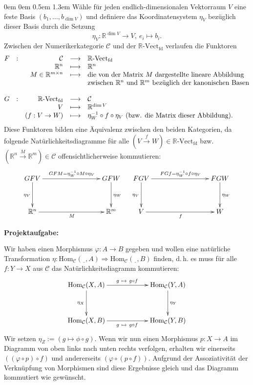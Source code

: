 \documentclass[a4paper,ngerman]{scrartcl}
\theoremstyle{definition}
\theoremstyle{plain}
\theoremstyle{remark}
\newcommand{\R}{\mathbb{R}}
\newcommand{\C}{\mathcal{C}}
\newcommand{\Hom}{\mathrm{Hom}}
\newcommand{\Vect}[1]{#1\text{-}\mathrm{Vect}}
\newcommand{\freist}{\underline{\ \ }}
\begin{document}
\begin{list}{}{0em \leftmargin0em \itemindent0.5em \itemsep 1.3em}
Wähle für jeden endlich-dimensionalen Vektorraum $V$ eine feste Basis $(b_1, \ldots, b_{\dim V})$ und definiere das Koordinatensystem $\eta_V$ bezüglich dieser Basis durch die Setzung
\[ \eta_V:\R^{\dim V} \to V,\ e_i \mapsto b_i. \]
Zwischen der Numerikerkategorie $\C$ und der $\Vect{\R}_{\mathrm{fd}}$ verlaufen die Funktoren
\[ \begin{array}{@{}rcrcl@{}}
  F &:& \C & \longrightarrow & \Vect{\R}_{\mathrm{fd}}\\
  && \R^{n} & \longmapsto & \R^{n}\\
  && M \in \R^{m \times n} & \longmapsto & \text{die von der Matrix $M$ dargestellte lineare Abbildung}\\
  &&&& \text{zwischen $\R^n$ und $\R^m$ bezüglich der kanonischen Basen}\\\\
  G &:& \Vect{\R}_{\mathrm{fd}} & \longrightarrow & \C\\
  && V & \longmapsto & \R^{\dim V}\\
  && (f:V \to W) & \longmapsto & \eta_W^{-1} \circ f \circ \eta_V \text{ (bzw. die Matrix dieser Abbildung).}
\end{array} \]
Diese Funktoren bilden eine Äquivalenz zwischen den beiden Kategorien, da folgende Natürlichkeitsdiagramme für alle $(V \xrightarrow{f} W) \in \Vect{\R}_{\mathrm{fd}}$ bzw. $(\R^n \xrightarrow{M} \R^m) \in \C$ offensichtlicherweise kommutieren:
\[ \xymatrixcolsep{7pc}\xymatrixrowsep{3pc}
\xymatrix{
  GFV \ar[d]_{\eta_V} \ar[r]^{GFM = \eta_W^{-1} \circ M \circ \eta_V} & GFW \ar[d]^{\eta_W}\\
  \R^{n} \ar[r]_{M} & \R^{m}
}
\quad
\xymatrix{
  FGV \ar[d]_{\eta_V} \ar[r]^{FGf = \eta_W^{-1} \circ f \circ \eta_V} & FGW \ar[d]^{\eta_W}\\
  V \ar[r]_{f} & W
} \]

\newpage
\item[\textbf{Projektaufgabe:}]\mbox{}

Wir haben einen Morphismus $\varphi:A \to B$ gegeben und wollen eine natürliche Transformation $\eta:\Hom_{\C}(\freist, A) \Rightarrow \Hom_{\C}(\freist, B)$ finden, d.\,h. es muss für alle $f:Y \to X$ aus $\C$ das Natürlichkeitsdiagramm kommutieren:
\[ \xymatrixcolsep{5pc}\xymatrixrowsep{3pc}\xymatrix{
  \Hom_{\C}(X, A) \ar[d]_{\eta_X} \ar[r]^{g\ \mapsto\ g \circ f} & \Hom_{\C}(Y, A) \ar[d]^{\eta_Y} \\
  \Hom_{\C}(X, B) \ar[r]_{g\ \mapsto\ g \circ f} & \Hom_{\C}(Y, B)
} \]
Wir setzen $\eta_{Z} := (g \mapsto \phi \circ g)$. Wenn wir nun einen Morphismus $p:X \to A$ im Diagramm von oben links nach unten rechts verfolgen, erhalten wir einerseits $((\varphi \circ p) \circ f)$ und andererseits
$(\varphi \circ (p \circ f))$. Aufgrund der Assoziativität der Verknüpfung von Morphismen sind diese Ergebnisse gleich und das Diagramm kommutiert wie gewünscht.

\end{list}
\end{document}
